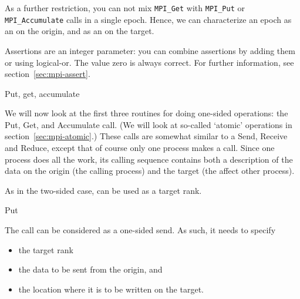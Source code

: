 As a further restriction, you can not mix \lstinline$MPI_Get$ with \lstinline$MPI_Put$
or \lstinline$MPI_Accumulate$ calls in a single epoch. Hence, we can
characterize an epoch as an  on the
origin, and as an  on the target.

Assertions are an integer parameter: you can combine assertions by
adding them or using logical-or.
The value zero is always correct. For further information, see
section~\ref{sec:mpi-assert}.



 {Put, get, accumulate}
\label{sec:putget}

We will now look at the first three routines for doing one-sided
operations: the Put, Get, and Accumulate call. (We will look at
so-called `atomic' operations in section~\ref{sec:mpi-atomic}.)
These calls are somewhat
similar to a Send, Receive and Reduce, except that of course only one
process makes a call.
Since one process does all the work, its calling sequence contains
both a description of the data on the origin (the calling process) and
the target (the affect other process).

As in the two-sided case,  can be used as
a target rank.

 {Put}

The  call can be considered as a one-sided
send. As such, it needs to specify
\begin{itemize}
\item the target rank
\item the data to be sent from the origin, and
\item the location where it is to be written on the target.
\end{itemize}

